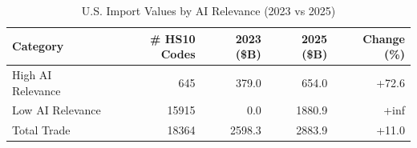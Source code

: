 \begin{table}[htbp]
\centering
\caption{U.S. Import Values by AI Relevance (2023 vs 2025)}
\label{tab:trade_by_relevance}
\setlength{\tabcolsep}{4.5mm}
\renewcommand{\arraystretch}{1.60}
\begin{tabular}{lrrrr}
\toprule
Category & \# HS10 Codes & 2023 (\$B) & 2025 (\$B) & Change (\%) \\
\midrule
High AI Relevance & 645 & 379.0 & 654.0 & +72.6 \\
Low AI Relevance & 15915 & 0.0 & 1880.9 & +inf \\
\midrule
Total Trade & 18364 & 2598.3 & 2883.9 & +11.0 \\
\bottomrule
\end{tabular}
\end{table}

